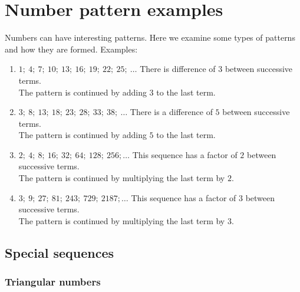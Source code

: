 \section{Number pattern examples}
Numbers can have interesting patterns. Here we examine some types of patterns and how they are formed.
Examples:
\begin{enumerate}[noitemsep, label=\textbf{\arabic*}. ] 
    \item $1;~4;~7;~10;~13;~16;~19;~22;~25;~\ldots$
    There is difference of $3$ between successive terms.\\
    The pattern is continued by adding $3$ to the last term.
    \item $3;~8;~13;~18;~23;~28;~33;~38;~\ldots$
    There is a difference of $5$ between successive terms.\\
    The pattern is continued by adding $5$ to the last term.
    \item $2;~4;~8;~16;~32;~64;~128;~256;\ldots$
    This sequence has a factor of $2$ between successive terms.\\
    The pattern is continued by multiplying the last term by $2$.
    \item $3;~9;~27;~81;~243;~729;~2187;\ldots$
    This sequence has a factor of $3$ between successive terms.\\
    The pattern is continued by multiplying the last term by $3$.
\end{enumerate}
     

\subsection*{Special sequences}

\subsubsection*{Triangular numbers}

